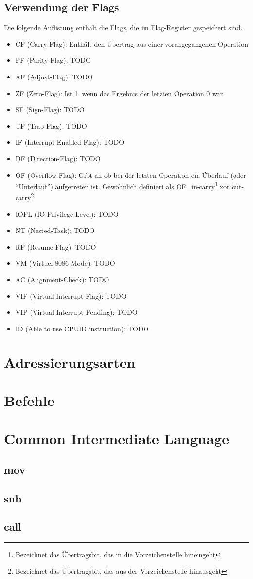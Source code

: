 \begin{multicols}{3}
\subsection{Verwendung der Flags}
Die folgende Auflistung enthält die Flags, die im Flag-Register gespeichert sind.
\begin{itemize}
\item CF (Carry-Flag): Enthält den Übertrag aus einer vorangegangenen Operation
\item PF (Parity-Flag): TODO
\item AF (Adjust-Flag): TODO
\item ZF (Zero-Flag): Ist 1, wenn das Ergebnis der letzten Operation 0 war.
\item SF (Sign-Flag): TODO
\item TF (Trap-Flag): TODO
\item IF (Interrupt-Enabled-Flag): TODO
\item DF (Direction-Flag): TODO
\item OF (Overflow-Flag): Gibt an ob bei der letzten Operation ein Überlauf (oder \enquote{Unterlauf}) aufgetreten ist. Gewöhnlich definiert als OF=in-carry\footnote{Bezeichnet das Übertragsbit, das in die Vorzeichenstelle hineingeht} xor out-carry\footnote{Bezeichnet das Übertragsbit, das aus der Vorzeichenstelle hinausgeht}
\item IOPL (IO-Privilege-Level): TODO
\item NT (Nested-Task): TODO
\item RF (Resume-Flag): TODO
\item VM (Virtuel-8086-Mode): TODO
\item AC (Alignment-Check): TODO
\item VIF (Virtual-Interrupt-Flag): TODO
\item VIP (Virtual-Interrupt-Pending): TODO
\item ID (Able to use CPUID instruction): TODO
\end{itemize}
\section{Adressierungsarten}
\section{Befehle}
\section{Common Intermediate Language}
\subsection{mov}
\subsection{sub}
\subsection{call}

\end{multicols}